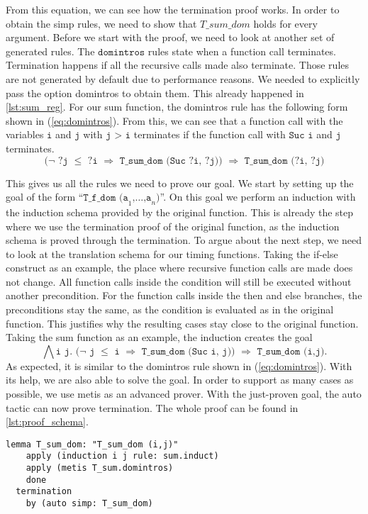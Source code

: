 From this equation, we can see how the termination proof works.
In order to obtain the simp rules, we need to show that $T\_sum\_dom$ holds for every argument.
Before we start with the proof, we need to look at another set of generated rules.
The $\texttt{domintros}$ rules state when a function call terminates.
Termination happens if all the recursive calls made also terminate.
Those rules are not generated by default due to performance reasons.
We needed to explicitly pass the option domintros to obtain them.
This already happened in \autoref{lst:sum_reg}.
For our sum function, the domintros rule has the following form shown in (\ref{eq:domintros}).
From this, we can see that a function call with the variables $\texttt{i}$ and $\texttt{j}$ with $\texttt{j > i}$ terminates
if the function call with $\texttt{Suc i}$ and $\texttt{j}$ terminates.
\begin{equation}
  \texttt{($\lnot$ ?j $\le$ ?i $\Longrightarrow$ T\_sum\_dom (Suc ?i, ?j)) $\Longrightarrow$ T\_sum\_dom (?i, ?j)}
\label{eq:domintros}
\end{equation}

This gives us all the rules we need to prove our goal.
We start by setting up the goal of the form ``$\texttt{T\_f\_dom (a}_{1}\texttt{,}\dots\texttt{,a}_{n}\texttt{)}$''.
On this goal we perform an induction with the induction schema provided by the original function.
This is already the step where we use the termination proof of the original function,
as the induction schema is proved through the termination.
To argue about the next step, we need to look at the translation schema for our timing functions.
Taking the if-else construct as an example, the place where recursive function calls are made does not change.
All function calls inside the condition will still be executed without another precondition.
For the function calls inside the then and else branches, the preconditions stay the same, as the condition is evaluated as in the original function.
This justifies why the resulting cases stay close to the original function.
Taking the sum function as an example, the induction creates the goal
\begin{equation*}
  \texttt{$\bigwedge$i j. ($\lnot$ j $\le$ i $\Longrightarrow$ T\_sum\_dom (Suc i, j)) $\Longrightarrow$ T\_sum\_dom (i,j)}.
\end{equation*}
As expected, it is similar to the domintros rule shown in (\ref{eq:domintros}).
With its help, we are also able to solve the goal.
In order to support as many cases as possible, we use metis as an advanced prover.
With the just-proven goal, the auto tactic can now prove termination.
The whole proof can be found in \autoref{lst:proof_schema}.
\begin{lstlisting}[language=isabelle,mathescape=true,label=lst:proof_schema,caption=Proof schema over dom with help of original function]
  lemma T_sum_dom: "T_sum_dom (i,j)"
    apply (induction i j rule: sum.induct)
    apply (metis T_sum.domintros)
    done
  termination
    by (auto simp: T_sum_dom)
\end{lstlisting}

